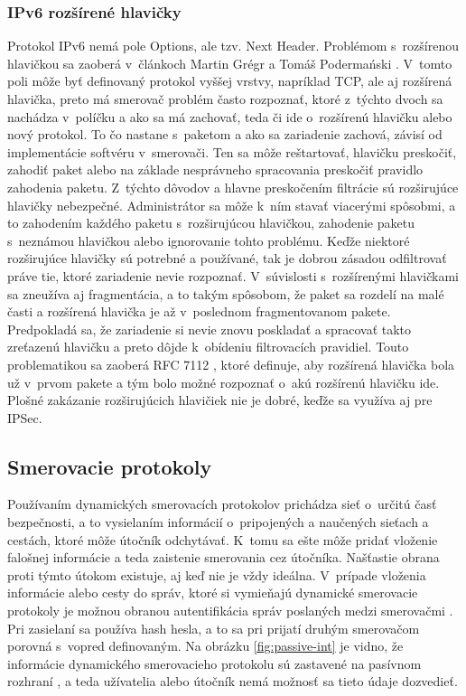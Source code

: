 \subsubsection{IPv6 rozšírené hlavičky}
Protokol IPv6 nemá pole Options, ale tzv. Next Header. Problémom s~rozšírenou hlavičkou sa zaoberá v~článkoch Martin Grégr a Tomáš Podermański \cite{Gregr2622015}\cite{Podermanski1922015}. V~tomto poli môže byť definovaný protokol vyššej vrstvy, napríklad TCP, ale aj rozšírená hlavička, preto má smerovač problém často rozpoznať, ktoré z~týchto dvoch sa nachádza v~políčku a ako sa má zachovať, teda či ide o~rozšírenú hlavičku alebo nový protokol. To čo nastane s~paketom a ako sa zariadenie zachová, závisí od implementácie softvéru v~smerovači. Ten sa môže reštartovať, hlavičku preskočiť, zahodiť paket alebo na základe nesprávneho spracovania preskočiť pravidlo zahodenia paketu. Z~týchto dôvodov a hlavne preskočením filtrácie sú rozširujúce hlavičky nebezpečné. Administrátor sa môže k~ním stavať viacerými spôsobmi, a to zahodením každého paketu s~rozširujúcou hlavičkou, zahodenie paketu s~neznámou hlavičkou alebo ignorovanie tohto problému. Keďže niektoré rozširujúce hlavičky sú potrebné a používané, tak je dobrou zásadou odfiltrovať práve tie, ktoré zariadenie nevie rozpoznať. V~súvislosti s~rozšírenými hlavičkami sa zneužíva aj fragmentácia, a to takým spôsobom, že paket sa rozdelí na malé časti a rozšírená hlavička je až v~poslednom fragmentovanom pakete. Predpokladá sa, že zariadenie si nevie znovu poskladať a spracovať takto zreťazenú hlavičku a preto dôjde k~obídeniu filtrovacích pravidiel. Touto problematikou sa zaoberá RFC 7112 \cite{L1L7agTQGYrRT6cd}, ktoré definuje, aby rozšírená hlavička bola už v~prvom pakete a tým bolo možné rozpoznať o~akú rozšírenú hlavičku ide. Plošné zakázanie rozširujúcich hlavičiek nie je dobré, keďže sa využíva aj pre IPSec.

\subsection{Smerovacie protokoly}
Používaním dynamických smerovacích protokolov prichádza sieť o~určitú časť bezpečnosti, a to vysielaním informácií o~pripojených a naučených sieťach a cestách, ktoré môže útočník odchytávať. K~tomu sa ešte môže pridať vloženie falošnej informácie a teda zaistenie smerovania cez útočníka. Našťastie obrana proti týmto útokom existuje, aj keď nie je vždy ideálna. V~prípade vloženia informácie alebo cesty do správ, ktoré si vymieňajú dynamické smerovacie protokoly je možnou obranou autentifikácia správ poslaných medzi smerovačmi \cite{McMillan2018}\cite{Singh2018}\cite{CIS_DrTLsgXv24lxeIIM}. Pri zasielaní sa používa hash hesla, a to sa pri prijatí druhým smerovačom porovná s~vopred definovaným. Na obrázku \ref{fig:passive-int} je vidno, že informácie dynamického smerovacieho protokolu sú zastavené na pasívnom rozhraní \cite{Khandelwal2016}, a teda užívatelia alebo útočník nemá možnosť sa tieto údaje dozvedieť.

